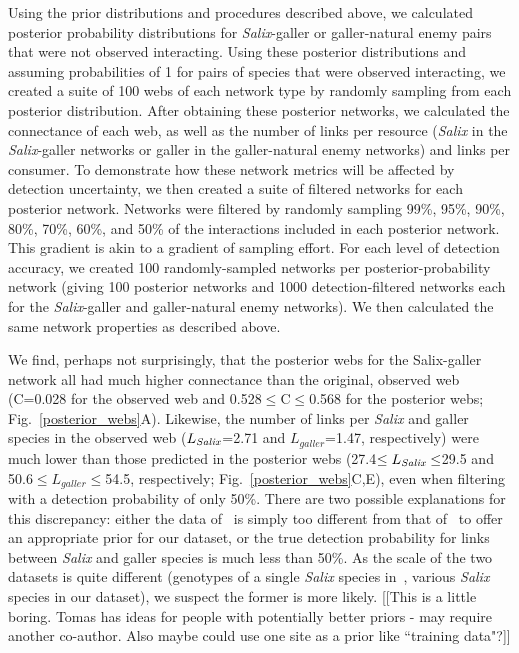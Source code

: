\documentclass[12pt]{article}
\begin{document}
    Using the prior distributions and procedures described above, we calculated posterior probability distributions for \emph{Salix}-galler or galler-natural enemy pairs that were not observed interacting. Using these posterior distributions and assuming probabilities of 1 for pairs of species that were observed interacting, we created a suite of 100 webs of each network type by randomly sampling from each posterior distribution. After obtaining these posterior networks, we calculated the connectance of each web, as well as the number of links per resource (\emph{Salix} in the \emph{Salix}-galler networks or galler in the galler-natural enemy networks) and links per consumer. To demonstrate how these network metrics will be affected by detection uncertainty, we then created a suite of filtered networks for each posterior network. Networks were filtered by randomly sampling 99\%, 95\%, 90\%, 80\%, 70\%, 60\%, and 50\% of the interactions included in each posterior network. This gradient is akin to a gradient of sampling effort. For each level of detection accuracy, we created 100 randomly-sampled networks per posterior-probability network (giving 100 posterior networks and 1000 detection-filtered networks each for the \emph{Salix}-galler and galler-natural enemy networks). We then calculated the same network properties as described above.


    We find, perhaps not surprisingly, that the posterior webs for the Salix-galler network all had much higher connectance than the original, observed web (C=0.028 for the observed web and 0.528$\leq$C$\leq$0.568 for the posterior webs; Fig.~\ref{posterior_webs}A). Likewise, the number of links per \emph{Salix} and galler species in the observed web ($L_{\emph{Salix}}$=2.71 and $L_{galler}$=1.47, respectively) were much lower than those predicted in the posterior webs (27.4$\leq L_{\emph{Salix}} \leq$29.5 and 50.6$\leq L_{galler} \leq $54.5, respectively; Fig.~\ref{posterior_webs}C,E), even when filtering with a detection probability of only 50\%. There are two possible explanations for this discrepancy: either the data of~\citet{Barbour2016} is simply too different from that of~\citet{Kopelke2017} to offer an appropriate prior for our dataset, or the true detection probability for links between \emph{Salix} and galler species is much less than 50\%. As the scale of the two datasets is quite different (genotypes of a single \emph{Salix} species in~\citet{Barbour2016}, various \emph{Salix} species in our dataset), we suspect the former is more likely.
    [[This is a little boring. Tomas has ideas for people with potentially better priors - may require another co-author. Also maybe could use one site as a prior like ``training data"?]]
\end{document}
